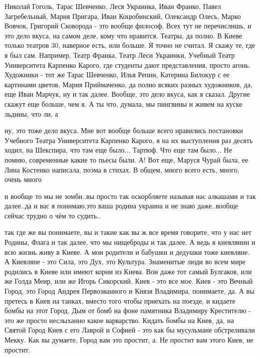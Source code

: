  
 
 
 
 

Николай Гоголь, Тарас Шевченко, Леся Украинка, Иван Франко, Павел Загребельный,
Мария Пригара, Иван Коцюбинский, Олександр Олесь, Марко Вовчок, Григорий
Сковорода - это вообще философ. Всех тут не перечислишь, и это дело вкуса, на
самом деле, кому что нравится. Театры, да полно. В Киеве только театров 30,
наверное есть, или больше. Я точно не считал. Я скажу те, где я был сам.
Например, Театр Франка, Театр Леси Украинки, Учебный Театр Университета
Карпенко Карого, где студенты дают представления, просто агонь. Художники - тот
же Тарас Шевченко, Илья Репин, Катерина Билокур с ее картинами цветов, Мария
Приймаченко, да полно всяких разных художников, да, еще Иван Марчук, ну и так
далее. Вообще, это дело вкуса, как я сказал. Другие скажут еще больше, чем я. А
ты что, думала, мы пингвины и живем на куске льдины, что ли, а

ну, это тоже дело вкуса. Мне вот вообще больше всего нравились постановки
Учебного Театра Университета Карпенко Карого, я на их выступления раз десять
ходил, на Шекспира, что там еще было... Тартюф. Что еще там было... Не помню,
современные какие то пьесы были. А! Вот еще, Маруся Чурай была, ее Лина
Костенко написала, поэма в стихах. В общем, много всего есть, много, очень
много

и вообще то мы не зомби..вы просто так оскорбляете называя нас алкашами и так
далее..да и вас я понимаю,это ваша родина украина и не знаю даже..вообще сейчас
трудно о чём то судить..

так где же вы понимаете, вы и такие как вы ж все время говорите, что у нас нет
Родины, Флага и так далее, что мы нищеброды и так далее. А ведь я киевлянин и
всю жизнь живу в Киеве. А мои родители и бабушки и дедушки тоже киевляне. А
Киевляне - это Сила, это Дух, это Культура. Знаменитые люди во всем мире
родились в Киеве или имеют корни из Киева. Вон даже тот самый Булгаков, или же
Голда Меир, или же Игорь Сикорский. Киев - это все мое. Киев - это Вечный
Город, это Город Андрея Первозванного и Князя Владимира, понимаете, да. А вы
претесь в Киев на танках, вместо того чтобы приехать на поезде, и кидаете бомбы
на этот Город. Дым от бомб на фоне памятника Владимиру Крестителю - это же
просто неслыханно какое варварство. Кидать бомбы на Киев, да, на Святой Город
Киев с его Лаврой и Софией - это как бы мусульмане обстреливали Мекку. Как вы
думаете, Город вам это простит, а. Не простит вам этого Киев, не простит.
